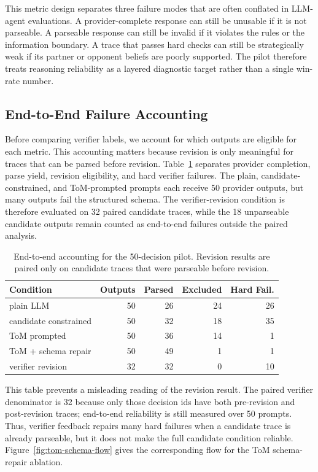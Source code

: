 \documentclass[sigconf,anonymous,review]{acmart}
\begin{document}
This metric design separates three failure modes that are often conflated in LLM-agent evaluations. A provider-complete response can still be unusable if it is not parseable. A parseable response can still be invalid if it violates the rules or the information boundary. A trace that passes hard checks can still be strategically weak if its partner or opponent beliefs are poorly supported. The pilot therefore treats reasoning reliability as a layered diagnostic target rather than a single win-rate number.

\subsection{End-to-End Failure Accounting}

Before comparing verifier labels, we account for which outputs are eligible for each metric. This accounting matters because revision is only meaningful for traces that can be parsed before revision. Table~\ref{tab:accounting} separates provider completion, parse yield, revision eligibility, and hard verifier failures. The plain, candidate-constrained, and ToM-prompted prompts each receive 50 provider outputs, but many outputs fail the structured schema. The verifier-revision condition is therefore evaluated on 32 paired candidate traces, while the 18 unparseable candidate outputs remain counted as end-to-end failures outside the paired analysis.

\begin{table}[t]
\centering
\caption{End-to-end accounting for the 50-decision pilot. Revision results are paired only on candidate traces that were parseable before revision.}
\label{tab:accounting}
\scriptsize
\begin{tabular}{lrrrr}
\toprule
Condition & Outputs & Parsed & Excluded & Hard Fail. \\
\midrule
plain LLM & 50 & 26 & 24 & 26 \\
candidate constrained & 50 & 32 & 18 & 35 \\
ToM prompted & 50 & 36 & 14 & 1 \\
ToM + schema repair & 50 & 49 & 1 & 1 \\
verifier revision & 32 & 32 & 0 & 10 \\
\bottomrule
\end{tabular}
\end{table}

This table prevents a misleading reading of the revision result. The paired verifier denominator is 32 because only those decision ids have both pre-revision and post-revision traces; end-to-end reliability is still measured over 50 prompts. Thus, verifier feedback repairs many hard failures when a candidate trace is already parseable, but it does not make the full candidate condition reliable. Figure~\ref{fig:tom-schema-flow} gives the corresponding flow for the ToM schema-repair ablation.
\end{document}
